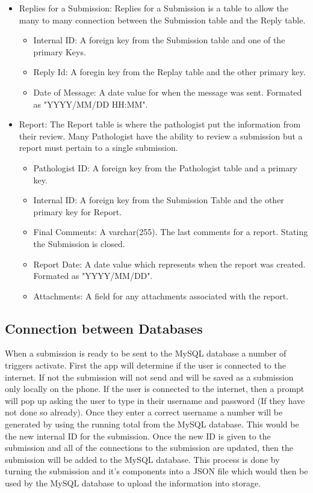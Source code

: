 \documentclass[onecolumn, draftclsnofoot,10pt, compsoc]{IEEEtran}
\begin{document}
\begin{itemize}
\item Replies for a Submission:\newline
Replies for a Submission is a table to allow the many to many connection between the Submission table and the Reply table.
\begin{itemize}
\item Internal ID: A foreign key from the Submission table and one of the primary Keys.
\item Reply Id: A foregin key from the Replay table and the other primary key.
\item Date of Message: A date value for when the message was sent. Formated as "YYYY/MM/DD HH:MM".
\end{itemize}

\item Report:\newline
The Report table is where the pathologist put the information from their review. Many Pathologist have the ability to review a submission but a report must pertain to a single submission.
\begin{itemize}
\item Pathologist ID: A foreign key from the Pathologist table and a primary key.
\item Internal ID: A foreign key from the Submission Table and the other primary key for Report.
\item Final Comments: A varchar(255). The last comments for a report. Stating the Submission is closed.
\item Report Date: A date value which represents when the report was created. Formated as "YYYY/MM/DD".
\item Attachments: A field for any attachments associated with the report.
\end{itemize}

\end{itemize}

\subsection{Connection between Databases}
When a submission is ready to be sent to the MySQL database a number of triggers activate. First the app will determine if the user is connected to the internet. If not the submission will not send and will be saved as a submission only locally on the phone. If the user is connected to the internet, then a prompt will pop up asking the user to type in their username and password (If they have not done so already). Once they enter a correct username a number will be generated by using the running total from the MySQL database. This would be the new internal ID for the submission. Once the new ID is given to the submission and all of the connections to the submission are updated, then the submission will be added to the MySQL database. This process is done by turning the submission and it's components into a JSON file which would then be used by the MySQL database to upload the information into storage.
\end{document}
